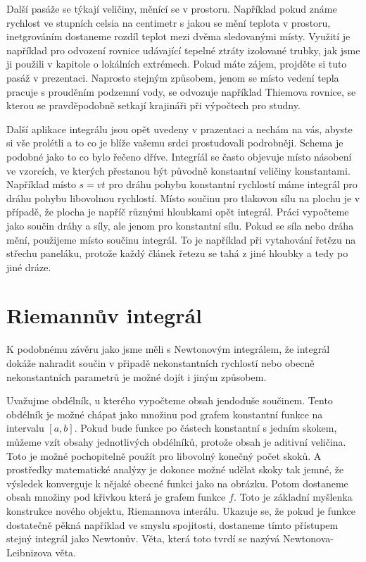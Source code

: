 \documentclass[12pt]{article}
\begin{document}
Další pasáže se týkají veličiny, měnící se v prostoru. Například pokud známe rychlost ve stupních celsia na centimetr s jakou se mění teplota v prostoru, inetgrováním dostaneme rozdíl teplot mezi dvěma sledovanými místy. Využití je například pro odvození rovnice udávající tepelné ztráty izolované trubky, jak jsme ji použili v kapitole o lokálních extrémech. Pokud máte zájem, projděte si tuto pasáž v prezentaci. Naprosto stejným způsobem, jenom se místo vedení tepla pracuje s prouděním podzemní vody, se odvozuje například Thiemova rovnice, se kterou se pravděpodobně setkají krajináři při výpočtech pro studny.

Další aplikace integrálu jsou opět uvedeny v prazentaci a nechám na vás, abyste si vše prolétli a to co je blíže vašemu srdci prostudovali podrobněji. Schema je podobné jako to co bylo řečeno dříve. Integríál se často objevuje místo násobení ve vzorcích, ve kterých přestanou být původně konstantní veličiny konstantami. Například místo $s=vt$ pro dráhu pohybu konstantní rychlostí máme integrál pro dráhu pohybu libovolnou rychlostí. Místo součinu pro tlakovou sílu na plochu je v případě, že plocha je napříč různými hloubkami opět integrál. Práci vypočteme jako součin dráhy a síly, ale jenom pro konstantní sílu. Pokud se síla nebo dráha mění, použijeme místo součinu integrál. To je například při vytahování řetězu na střechu paneláku, protože každý článek řetezu se tahá z jiné hloubky a tedy po jiné dráze.

\section*{Riemannův integrál}

K podobnému závěru jako jsme měli s Newtonovým integrálem, že integrál dokáže nahradit součin v připadě nekonstantních rychlostí nebo obecně nekonstantních parametrů je možné dojít i  jiným způsobem.

Uvažujme obdélník, u kterého vypočteme obsah jendoduše součinem. Tento obdélník je možné chápat jako množinu pod grafem konstantní funkce na intervalu $[a,b]$. Pokud bude funkce po částech konstantní s jedním skokem, můžeme vzít obsahy jednotlivých obdélníků, protože obsah je aditivní veličina. Toto je možné pochopitelně použít pro libovolný konečný počet skoků. A prostředky matematické analýzy je dokonce možné udělat skoky tak jemné, že výsledek konverguje k nějaké obecné funkci jako na obrázku. Potom dostaneme obsah množiny pod křivkou která je grafem funkce $f$. Toto je základní myšlenka konstrukce nového objektu, Riemannova interálu. Ukazuje se, že pokud je funkce dostatečně pěkná například ve smyslu spojitosti, dostaneme tímto přístupem stejný integrál jako Newtonův. Věta, která toto tvrdí se nazývá Newtonova-Leibnizova věta. 
\end{document}
